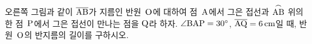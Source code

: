\noindent\begin{minipage}[t]{0.58\linewidth}\vspace{0pt}\raggedright 오른쪽 그림과 같이 $\overline{\mathrm{AB}}$가 지름인 반원~$\mathrm{O}$에 대하여 점~$\mathrm{A}$에서 그은 접선과 $\overset{\frown}{\mathrm{AB}}$ 위의 한 점~$\mathrm{P}$에서 그은 접선이 만나는 점을 $\mathrm{Q}$라 하자. $\angle\mathrm{BAP}=30^\circ$, $\overline{\mathrm{AQ}}=6\,\mathrm{cm}$일 때, 반원~$\mathrm{O}$의 반지름의 길이를 구하시오.\end{minipage}\hfill\begin{minipage}[t]{0.4\linewidth}\vspace{0pt}\centering \resizebox{\ifdim\width>\linewidth\linewidth\else\width\fi}{!}{}\end{minipage}\par
